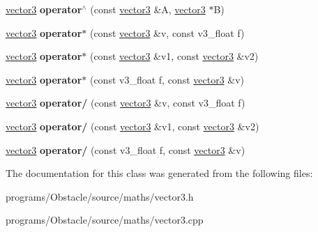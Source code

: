 \begin{DoxyCompactItemize}
\item 
\hyperlink{classns__phys_1_1vector3}{vector3} {\bfseries operator$^\wedge$} (const \hyperlink{classns__phys_1_1vector3}{vector3} \&A, \hyperlink{classns__phys_1_1vector3}{vector3} $\ast$B)\hypertarget{classns__phys_1_1vector3_a7d3cb39c9697eb8c4a8c65b1df15b66a}{}\label{classns__phys_1_1vector3_a7d3cb39c9697eb8c4a8c65b1df15b66a}

\item 
\hyperlink{classns__phys_1_1vector3}{vector3} {\bfseries operator$\ast$} (const \hyperlink{classns__phys_1_1vector3}{vector3} \&v, const v3\+\_\+float f)\hypertarget{classns__phys_1_1vector3_a1bd5189736307bc4190ee33abd09eb3e}{}\label{classns__phys_1_1vector3_a1bd5189736307bc4190ee33abd09eb3e}

\item 
\hyperlink{classns__phys_1_1vector3}{vector3} {\bfseries operator$\ast$} (const \hyperlink{classns__phys_1_1vector3}{vector3} \&v1, const \hyperlink{classns__phys_1_1vector3}{vector3} \&v2)\hypertarget{classns__phys_1_1vector3_a1e161332339e868c740c5e0208acb916}{}\label{classns__phys_1_1vector3_a1e161332339e868c740c5e0208acb916}

\item 
\hyperlink{classns__phys_1_1vector3}{vector3} {\bfseries operator$\ast$} (const v3\+\_\+float f, const \hyperlink{classns__phys_1_1vector3}{vector3} \&v)\hypertarget{classns__phys_1_1vector3_ad6ebcccb73b9ac9d5b16f9e0e42aba47}{}\label{classns__phys_1_1vector3_ad6ebcccb73b9ac9d5b16f9e0e42aba47}

\item 
\hyperlink{classns__phys_1_1vector3}{vector3} {\bfseries operator/} (const \hyperlink{classns__phys_1_1vector3}{vector3} \&v, const v3\+\_\+float f)\hypertarget{classns__phys_1_1vector3_a578403d30834aab1970e298093281244}{}\label{classns__phys_1_1vector3_a578403d30834aab1970e298093281244}

\item 
\hyperlink{classns__phys_1_1vector3}{vector3} {\bfseries operator/} (const \hyperlink{classns__phys_1_1vector3}{vector3} \&v1, const \hyperlink{classns__phys_1_1vector3}{vector3} \&v2)\hypertarget{classns__phys_1_1vector3_a9498b9a61398440788a22dc55a73166a}{}\label{classns__phys_1_1vector3_a9498b9a61398440788a22dc55a73166a}

\item 
\hyperlink{classns__phys_1_1vector3}{vector3} {\bfseries operator/} (const v3\+\_\+float f, const \hyperlink{classns__phys_1_1vector3}{vector3} \&v)\hypertarget{classns__phys_1_1vector3_a0011c44e349f2926a6e78273d45691bd}{}\label{classns__phys_1_1vector3_a0011c44e349f2926a6e78273d45691bd}

\end{DoxyCompactItemize}


The documentation for this class was generated from the following files\+:\begin{DoxyCompactItemize}
\item 
programs/\+Obstacle/source/maths/vector3.\+h\item 
programs/\+Obstacle/source/maths/vector3.\+cpp\end{DoxyCompactItemize}
